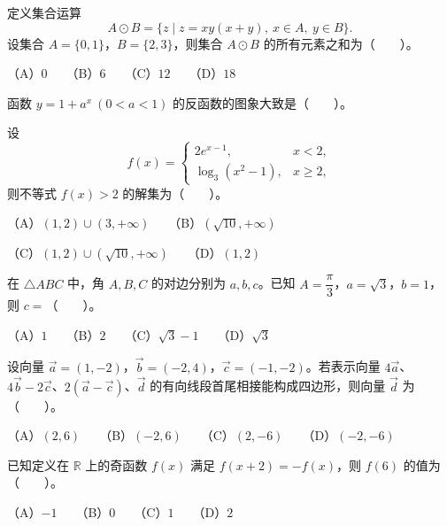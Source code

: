 \begin{question}
定义集合运算
\nopagebreak[4]
\[
A\odot B=\{z\mid z=xy(x+y),\ x\in A,\ y\in B\}.
\]
设集合 $A=\{0,1\}$，$B=\{2,3\}$，则集合 $A\odot B$ 的所有元素之和为\mbox{（　　）}。

（A）$0$　　（B）$6$　　（C）$12$　　（D）$18$

\Needspace{0.4\textheight}
\end{question}
\begin{question}
函数 $y=1+a^x\ (0<a<1)$ 的反函数的图象大致是\mbox{（　　）}。
\nopagebreak[4]
\begin{center}\end{center}
\nopagebreak[4]
\end{question}
\begin{question}
设
\nopagebreak[4]
\[
f(x)=\begin{cases}
2e^{x-1}, & x<2,\\
\log_3(x^2-1), & x\ge 2,
\end{cases}
\]
则不等式 $f(x)>2$ 的解集为\mbox{（　　）}。

（A）$(1,2)\cup(3,+\infty)$　　（B）$(\sqrt{10},+\infty)$

（C）$(1,2)\cup(\sqrt{10},+\infty)$　　（D）$(1,2)$

\end{question}
\begin{question}
在 $\triangle ABC$ 中，角 $A,B,C$ 的对边分别为 $a,b,c$。已知 $A=\dfrac{\pi}{3}$，$a=\sqrt3$，$b=1$，则 $c=$\mbox{（　　）}。

（A）$1$　　（B）$2$　　（C）$\sqrt3-1$　　（D）$\sqrt3$

\end{question}
\begin{question}
设向量 $\vec a=(1,-2)$，$\vec b=(-2,4)$，$\vec c=(-1,-2)$。若表示向量 $4\vec a$、$4\vec b-2\vec c$、$2(\vec a-\vec c)$、$\vec d$ 的有向线段首尾相接能构成四边形，则向量 $\vec d$ 为\mbox{（　　）}。

（A）$(2,6)$　　（B）$(-2,6)$　　（C）$(2,-6)$　　（D）$(-2,-6)$

\end{question}
\begin{question}
已知定义在 $\mathbb R$ 上的奇函数 $f(x)$ 满足 $f(x+2)=-f(x)$，则 $f(6)$ 的值为\mbox{（　　）}。

（A）$-1$　　（B）$0$　　（C）$1$　　（D）$2$

\end{question}
